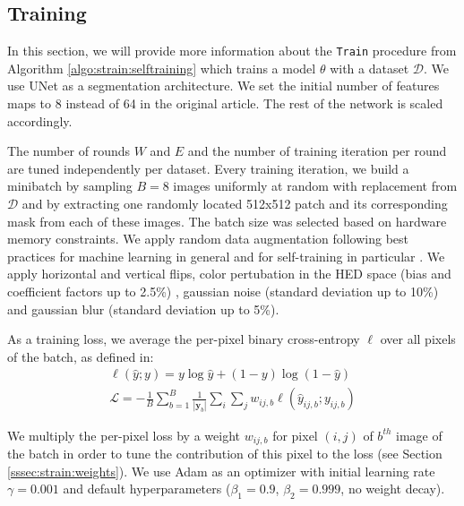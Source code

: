 \subsection{Training}
\label{ssec:strain:training_protocol}

In this section, we will provide more information about the \texttt{Train} procedure from Algorithm \ref{algo:strain:selftraining} which trains a model $\theta$ with a dataset $\mathcal{D}$.
We use UNet \parencite{ronneberger2015unet} as a segmentation architecture. We set the initial number of features maps to 8 instead of 64 in the original article. The rest of the network is scaled accordingly. 

The number of rounds $W$ and $E$ and the number of training iteration per round are tuned independently per dataset. Every training iteration, we build a minibatch by sampling $B=8$ images uniformly at random with replacement from $\mathcal{D}$ and by extracting one randomly located 512x512 patch and its corresponding mask from each of these images. The batch size was selected based on hardware memory constraints. We apply random data augmentation following best practices for machine learning in general and for self-training in particular \parencite{xie2020self, sohn2020fixmatch}. We apply horizontal and vertical flips, color pertubation in the HED space \parencite{tellez2018whole} (bias and coefficient factors up to 2.5\%) , gaussian noise (standard deviation up to 10\%) and gaussian blur (standard deviation up to 5\%). 

As a training loss, we average the per-pixel binary cross-entropy $\ell$ over all pixels of the batch, as defined in:
\begin{align}
\ell(\hat{y}; y) = y \log \hat{y} + (1 - y) \log (1 - \hat{y}) \label{eqn:strain:perpixel_crossentropy} \\
\mathcal{L} = - \frac{1}{B} \sum_{b=1}^B \frac{1}{|\mathbf{y}_b|}\sum_{i}\sum_{j} w_{ij, b} \ell(\hat{y}_{ij, b}; y_{ij,b }) 
\label{eqn:strain:overallloss}
\end{align}

We multiply the per-pixel loss by a weight $w_{ij, b}$ for pixel $(i, j)$ of $b^{th}$ image of the batch in order to tune the contribution of this pixel to the loss (see Section \ref{sssec:strain:weights}). We use Adam \parencite{kingma2014adam} as an optimizer with initial learning rate $\gamma= 0.001$ and default hyperparameters ($\beta_1 = 0.9$, $\beta_2 = 0.999$, no weight decay).


